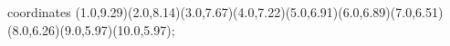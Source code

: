 					coordinates { (1.0,9.29)(2.0,8.14)(3.0,7.67)(4.0,7.22)(5.0,6.91)(6.0,6.89)(7.0,6.51)(8.0,6.26)(9.0,5.97)(10.0,5.97)};